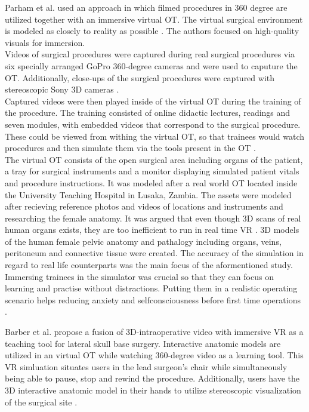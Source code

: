 Parham et al. used an approach in which filmed procedures in 360 degree are utilized together with an immersive virtual OT.
The virtual surgical environment is modeled as closely to reality as possible \cite{Parham.2019}.
The authors focused on high-quality visuals for immersion.
\\ Videos of surgical procedures were captured during real surgical procedures via six specially arranged GoPro 360-degree cameras and were used to caputure the OT.
Additionally, close-ups of the surgical procedures were captured with stereoscopic Sony 3D cameras \cite{Parham.2019}.
\\ Captured videos were then played inside of the virtual OT during the training of the procedure.
The training consisted of online didactic lectures, readings and seven modules, with embedded videos that correspond to the surgical procedure.
These could be viewed from withing the virtual OT, so that trainees would watch procedures and then simulate them via the tools present in the OT \cite{Parham.2019}.
\\ The virtual OT consists of the open surgical area including organs of the patient, a tray for surgical instruments and a monitor displaying simulated patient vitals and procedure instructions.
It was modeled after a real world OT located inside the University Teaching Hospital in Lusaka, Zambia.
The assets were modeled after recieving reference photos and videos of locations and instruments and researching the female anatomy.
It was argued that even though 3D scans of real human organs exists, they are too inefficient to run in real time VR \cite{RN52}.
3D models of the human female pelvic anatomy and pathalogy including organs, veins, peritoneum and connective tissue were created.
The accuracy of the simulation in regard to real life counterparts was the main focus of the aformentioned study.
Immersing trainees in the simulator was crucial so that they can focus on learning and practise without distractions.
Putting them in a realistic operating scenario helps reducing anxiety and selfconsciousness before first time operations \cite{Parham.2019}.

Barber et al. propose a fusion of 3D-intraoperative video with immersive VR as a teaching tool for lateral skull base surgery.
Interactive anatomic models are utilized in an virtual OT while watching 360-degree video as a learning tool.
This VR simluation situates users in the lead surgeon's chair while simultaneously being able to pause, stop and rewind the procedure.
Additionally, users have the 3D interactive anatomic model in their hands to utilize stereoscopic visualization of the surgical site \cite{Barber.2020}.
